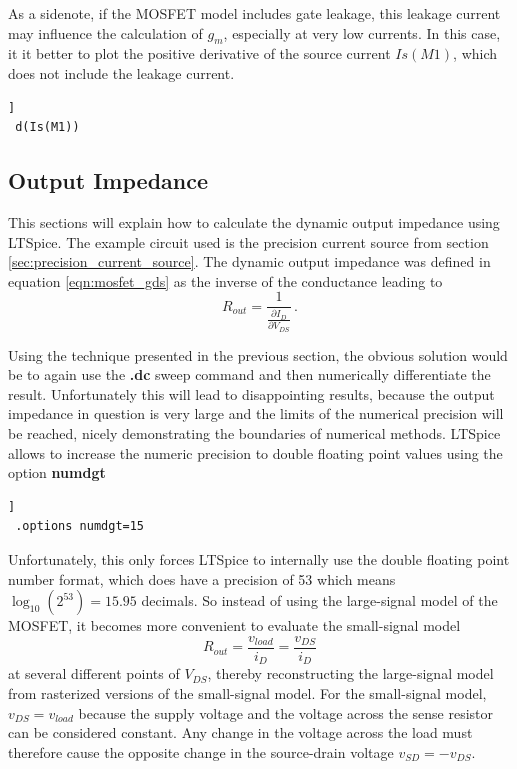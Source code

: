 \documentclass[12pt]{book}
\begin{document}
As a sidenote, if the MOSFET model includes gate leakage, this leakage current may influence the calculation of $g_m$, especially at very low currents. In this case, it it better to plot the positive derivative of the source current $Is(M1)$, which does not include the leakage current.
\begin{lstlisting}[frame=single, xleftmargin=5mm, xrightmargin=5mm, columns=fullflexible, morekeywords={model, dc}, keywordstyle=\bfseries, basicstyle=\rmfamily]]
 d(Is(M1))
\end{lstlisting}

\subsection{Output Impedance}
This sections will explain how to calculate the dynamic output impedance using LTSpice. The example circuit used is the precision current source from section \ref{sec:precision_current_source}. The dynamic output impedance was defined in equation \ref{eqn:mosfet_gds} as the inverse of the conductance leading to
\begin{equation*}
    R_{out} = \frac{1}{\frac{\partial I_D}{\partial V_{DS}}} \,.
\end{equation*}

Using the technique presented in the previous section, the obvious solution would be to again use the \textbf{.dc} sweep command and then numerically differentiate the result. Unfortunately this will lead to disappointing results, because the output impedance in question is very large and the limits of the numerical precision will be reached, nicely demonstrating the boundaries of numerical methods. LTSpice allows to increase the numeric precision to double floating point values using the option \textbf{numdgt}
\begin{lstlisting}[frame=single, xleftmargin=5mm, xrightmargin=5mm, columns=fullflexible, morekeywords={model, dc, options}, keywordstyle=\bfseries, basicstyle=\rmfamily]]
 .options numdgt=15
\end{lstlisting}
Unfortunately, this only forces LTSpice to internally use the double floating point number format, which does have a precision of \qty{53}{\bit} which means $\log_{10}\left(2^{53}\right) = 15.95$ decimals. So instead of using the large-signal model of the MOSFET, it becomes more convenient to evaluate the small-signal model
\begin{equation*}
    R_{out} = \frac{v_{load}}{i_D} = \frac{v_{DS}}{i_D}
\end{equation*}
at several different points of $V_{DS}$, thereby reconstructing the large-signal model from rasterized versions of the small-signal model. For the small-signal model, $v_{DS} = v_{load}$ because the supply voltage and the voltage across the sense resistor can be considered constant. Any change in the voltage across the load must therefore cause the opposite change in the source-drain voltage $v_{SD} = - v_{DS}$.
\end{document}
